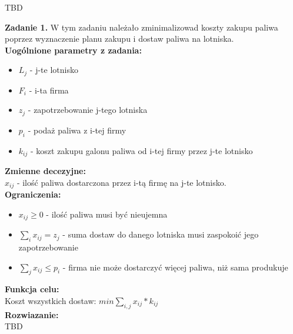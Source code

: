 \documentclass[15pt, a4paper]{article}
\begin{document}
TBD

\vspace{0.5cm}

\noindent\hrulefill

\vspace{0.5cm}


\noindent\textbf{Zadanie 1.} W tym zadaniu należało zminimalizowad koszty zakupu paliwa poprzez wyznaczenie planu zakupu i dostaw paliwa na lotniska.\\

\noindent\textbf{Uogólnione parametry z zadania:}

\begin{itemize}
    \item \( L_j \) - j-te lotnisko
    \item \( F_i \) - i-ta firma
    \item \( z_j \) - zapotrzebowanie j-tego lotniska
    \item \( p_i \) - podaż paliwa z i-tej firmy
    \item \( k_{ij} \) - koszt zakupu galonu paliwa od i-tej firmy przez j-te lotnisko
\end{itemize}

\noindent\textbf{Zmienne decezyjne:}\\

\(x_{ij}\) - ilość paliwa dostarczona przez i-tą firmę na j-te lotnisko.\\

\noindent\textbf{Ograniczenia:}

\begin{itemize}
    \item \(x_{ij} \geq 0 \) - ilość paliwa musi być nieujemna
    \item \(\sum_{i}x_{ij} = z_j\)  - suma dostaw do danego lotniska musi zaspokoić jego zapotrzebowanie 
    \item \(\sum_{j}x_{ij} \leq p_i \) - firma nie może dostarczyć więcej paliwa, niż sama produkuje
\end{itemize}

\noindent\textbf{Funkcja celu:}\\

Koszt wszystkich dostaw: \(min \sum_{i, j}x_{ij} * k_{ij} \)\\

\noindent\textbf{Rozwiazanie:}\\ 

TBD

\vspace{0.5cm}

\noindent\hrulefill

\vspace{0.5cm}
\end{document}
